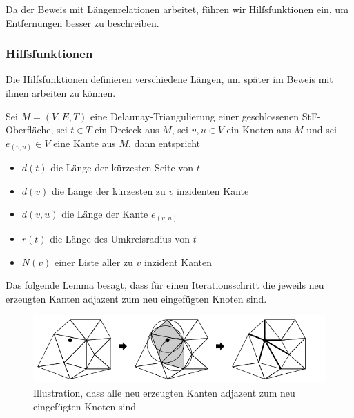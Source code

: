 Da der Beweis mit  Längenrelationen arbeitet, führen wir Hilfsfunktionen ein, um Entfernungen besser zu beschreiben. 

\subsubsection{Hilfsfunktionen}
Die Hilfsfunktionen definieren verschiedene Längen, um später im Beweis mit ihnen arbeiten zu können.
\begin{definition}
Sei $M = (V,E,T)$ eine Delaunay-Triangulierung  einer geschlossenen StF-Oberfläche, sei $t \in T$ ein Dreieck aus $M$, sei $v,u \in V$ ein Knoten aus $M$ und sei $e_{(v,u)} \in V$ eine Kante aus $M$,  dann entspricht
\begin{itemize}
    \item $d(t)$ die Länge der kürzesten Seite von $t$
    \item $d(v)$ die Länge der kürzesten zu $v$ inzidenten Kante
    \item $d(v,u)$ die Länge der Kante  $e_{(v,u)}$
    \item $r(t)$ die Länge des Umkreisradius von $t$
    \item $N(v)$ einer Liste aller zu $v$ inzident Kanten
\end{itemize}


\end{definition}



Das folgende Lemma besagt, dass für einen Iterationsschritt die jeweils neu erzeugten Kanten adjazent zum neu eingefügten Knoten sind.



\begin{figure}[h!]
    \centering
    \includegraphics[width=5in]{images/adejazent.png}
    \caption{Illustration, dass alle neu erzeugten Kanten adjazent zum neu eingefügten Knoten sind \cite{shewchuk:1997:delaunay} }%
    \label{fig:Punkt_einfügen}
\end{figure}
 


